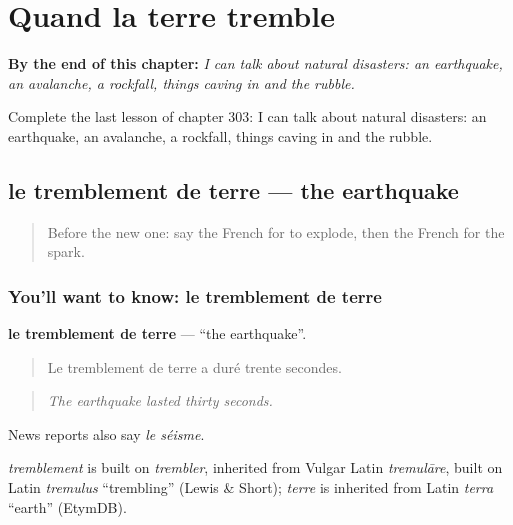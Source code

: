 
\chapter{Quand la terre tremble}
\label{ch:fr-quand-la-terre-tremble}

\begin{chapteropening}
\textbf{By the end of this chapter:} \emph{I can talk about natural disasters: an earthquake, an avalanche, a rockfall, things caving in and the rubble.}

Complete the last lesson of chapter 303: I can talk about natural disasters: an earthquake, an avalanche, a rockfall, things caving in and the rubble.
\end{chapteropening}

\section[le tremblement de terre]{le tremblement de terre — the earthquake}

\label{lesson:FR-C303-tremblement-de-terre}



\begin{quote}
Before the new one: say the French for to explode, then the French for the spark.
\end{quote}

\subsection*{You'll want to know: le tremblement de terre}
\textbf{le tremblement de terre} — \textquotedblleft{}the earthquake\textquotedblright{}.

\begin{quote}
Le tremblement de terre a duré trente secondes.
\end{quote}

\begin{quote}
\emph{The earthquake lasted thirty seconds.}
\end{quote}

News reports also say \emph{le séisme}.

\begin{cousinweb}
\emph{tremblement} is built on \emph{trembler}, inherited from Vulgar Latin \emph{tremulāre}, built on Latin \emph{tremulus} \textquotedblleft{}trembling\textquotedblright{} (Lewis \& Short); \emph{terre} is inherited from Latin \emph{terra} \textquotedblleft{}earth\textquotedblright{} (EtymDB).
\end{cousinweb}

